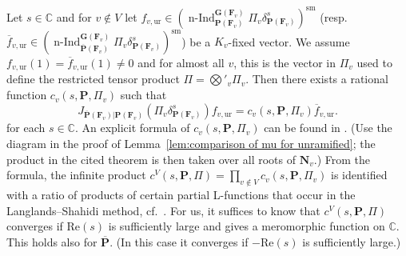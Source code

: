 \documentclass[a4paper]{amsart}
\numberwithin{equation}{section}
\theoremstyle{remark}
\theoremstyle{definition}
\DeclareMathOperator{\nInd}{n-Ind}
\newcommand{\C}{\mathbb{C}}
\newcommand{\sm}{\mathrm{sm}}
\newcommand{\unram}{\mathrm{ur}}
\newcommand{\glob}[1]{\boldsymbol{#1}}
\begin{document}
Let $s\in \C$ and for $v \notin V$ let $f_{v,\unram}\in (\nInd_{\glob{P}(\glob{F}_{v})}^{\glob{G}(\glob{F}_{v})}\Pi_{v}\delta_{\glob{P}(\glob{F}_{v})}^{s})^{\sm}$ (resp.\ $\overline{f}_{v,\unram}\in (\nInd_{\overline{\glob{P}}(\glob{F}_{v})}^{\glob{G}(\glob{F}_{v})}\Pi_{v}\delta_{\glob{P}(\glob{F}_{v})}^{s})^{\sm}$) be a $K_{v}$-fixed vector.
We assume $f_{v,\unram}(1) = \overline{f}_{v,\unram}(1)\ne 0$ and for almost all $v$, this is the vector in $\Pi_{v}$ used to define the restricted tensor product $\Pi = \bigotimes'_{v}\Pi_{v}$.
Then there exists a rational function $c_{v}(s,\glob{P},\Pi_{v})$ such that 
\[
J_{\overline{\glob{P}}(\glob{F}_{v})|\glob{P}(\glob{F}_{v})}(\Pi_{v}\delta_{\glob{P}(\glob{F}_{v})}^{s})f_{v,\unram} = c_{v}(s,\glob{P},\Pi_{v})\overline{f}_{v,\unram}.
\]
for each $s\in \C$.
An explicit formula of $c_{v}(s,\glob{P},\Pi_{v})$ can be found in \cite[3.1~Theorem]{MR571057}.
(Use the diagram in the proof of Lemma~\ref{lem:comparison of mu for unramified}; the product in the cited theorem is then taken over all roots of $\glob{N}_v$.)
From the formula, the infinite product $c^{V}(s,\glob{P},\Pi) = \prod_{v\notin V}c_{v}(s,\glob{P},\Pi_{v})$ is identified with a ratio of products of certain partial L-functions
that occur in the Langlands--Shahidi method, cf.\ \cite[(2.7)]{MR942520}.
For us, it suffices to know that $c^{V}(s,\glob{P},\Pi)$ converges if $\mathrm{Re}(s)$ is sufficiently large and gives a meromorphic function on $\C$.
This holds also for $\overline{\glob{P}}$. (In this case it converges if $-\mathrm{Re}(s)$ is sufficiently large.)
\end{document}
